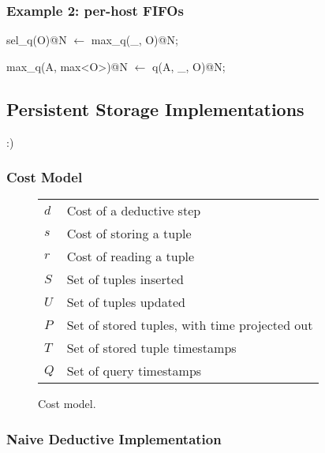 \subsubsection{Example 2: per-host FIFOs}

\begin{Dedalus}
sel\_q(O)@N \(\leftarrow\)
  max\_q(_, O)@N; 

max\_q(A, max<O>)@N \(\leftarrow\)
  q(A, \_, O)@N;
\end{Dedalus}


\subsection{Persistent Storage Implementations}

:)

\subsubsection{Cost Model}

\begin{figure}[t]
\begin{tabular}{ll} \hline
$d$ & Cost of a deductive step \\
$s$ & Cost of storing a tuple \\
$r$ & Cost of reading a tuple \\ 
\hline
$S$ & Set of tuples inserted \\
$U$ & Set of tuples updated \\
$P$ & Set of stored tuples, with time projected out \\ 
$T$ & Set of stored tuple timestamps \\ 
$Q$ & Set of query timestamps \\ \hline 
\end{tabular}
\caption{Cost model.}
\label{fig:breakdown}
\end{figure}


\subsubsection{Naive Deductive Implementation}

